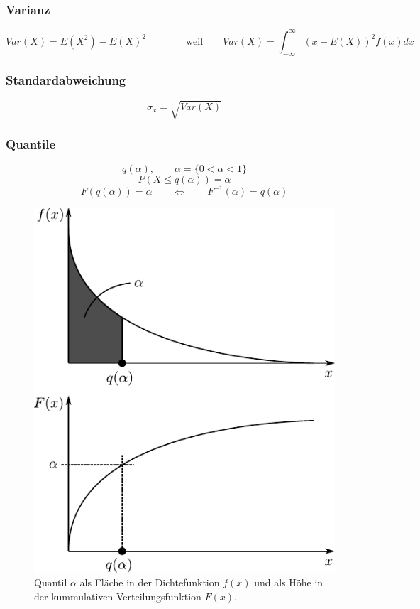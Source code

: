 \subsubsection{Varianz}
\[ Var(X) = E(X^2) - E(X)^2 \qquad \qquad \text{weil} \qquad 
   Var(X) = \int_{-\infty}^{\infty} (x-E(X))^2 f(x) d x \] 

\subsubsection{Standardabweichung}
\[ \sigma_x = \sqrt{Var(X)} \]

\subsubsection{Quantile}
\[ q(\alpha), \qquad \alpha=\{ 0 < \alpha < 1 \} \]
\[ P(X \leq q(\alpha)) = \alpha \]
\[ F(q(\alpha)) = \alpha \qquad 
   \Leftrightarrow \qquad F^{-1}(\alpha) = q(\alpha)\]

\begin{figure}[h!]
        \centering
        \includegraphics[scale=\graphscale]{dichtefunktion-quantile.pdf}
        \caption{Quantil $\alpha$ als Fläche in der Dichtefunktion $f(x)$ und
                 als Höhe in der kummulativen Verteilungsfunktion $F(x)$.}
\end{figure}


